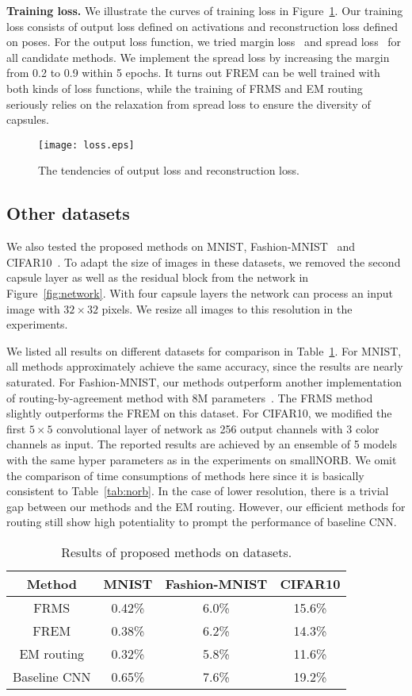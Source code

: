 \documentclass[runningheads]{llncs}
\begin{document}
\textbf{Training loss.} We illustrate the curves of training loss in Figure~\ref{fig:loss}. Our training loss consists of output loss defined on activations and reconstruction loss defined on poses. For the output loss function, we tried margin loss~\cite{sabour2017dynamic} and spread loss~\cite{hinton2018emrouting} for all candidate methods. We implement the spread loss by increasing the margin from 0.2 to 0.9 within 5 epochs. It turns out FREM can be well trained with both kinds of loss functions, while the training of FRMS and EM routing seriously relies on the relaxation from spread loss to ensure the diversity of capsules.
\begin{figure}
\centering
\texttt{[image: loss.eps]}
\caption{The tendencies of output loss and reconstruction loss.}
\label{fig:loss}
\end{figure}

\subsection{Other datasets}
We also tested the proposed methods on MNIST, Fashion-MNIST~\cite{xiao2017online} and CIFAR10~\cite{krizhevsky2009learning}. To adapt the size of images in these datasets, we removed the second capsule layer as well as the residual block from the network in Figure~\ref{fig:network}. With four capsule layers the network can process an input image with $32\times{32}$ pixels. We resize all images to this resolution in the experiments.

We listed all results on different datasets for comparison in Table~\ref{tab:datasets}. For MNIST, all methods approximately achieve the same accuracy, since the results are nearly saturated. For Fashion-MNIST, our methods outperform another implementation of routing-by-agreement method with 8M parameters~\cite{xiao2017online}. The FRMS method slightly outperforms the FREM on this dataset. For CIFAR10, we modified the first $5\times{5}$ convolutional layer of network as 256 output channels with 3 color channels as input. The reported results are achieved by an ensemble of 5 models with the same hyper parameters as in the experiments on smallNORB. We omit the comparison of time consumptions of methods here since it is basically consistent to Table~\ref{tab:norb}. In the case of lower resolution, there is a trivial gap between our methods and the EM routing. However, our efficient methods for routing still show high potentiality to prompt the performance of baseline CNN.   
\begin{table}
\centering
\caption{Results of proposed methods on datasets.}
\label{tab:datasets}
\begin{tabular}{cccc}
\toprule
Method & MNIST & Fashion-MNIST & CIFAR10 \\
\midrule
FRMS & 0.42\% & 6.0\% & 15.6\% \\
FREM & 0.38\% & 6.2\% & 14.3\% \\
EM routing & 0.32\% & 5.8\% & 11.6\% \\
Baseline CNN & 0.65\% & 7.6\% & 19.2\% \\
\bottomrule
\end{tabular}
\end{table}
\end{document}
